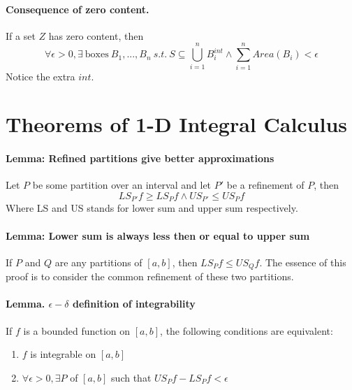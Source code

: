 \documentclass[11pt]{article}
\begin{document}
\paragraph{Consequence of zero content.}If a set $Z$ has zero content, then
\begin{equation*}
    \forall \epsilon>0, \exists~\text{boxes}~B_1,...,B_n~s.t.~ S\subseteq \bigcup_{i=1}^{n}B^{int}_i \wedge \sum_{i=1}^{n}{Area(B_i)} < \epsilon
\end{equation*}
Notice the extra $int$.
\section{Theorems of 1-D Integral Calculus}
\paragraph{Lemma: Refined partitions give better approximations} Let $P$ be some partition over an interval and let $P'$ be a refinement of $P$, then
\begin{equation*}
    LS_{P'}f \geq LS_{P}f \wedge US_{P'} \leq US_{P}f
\end{equation*}
Where LS and US stands for lower sum and upper sum respectively.

\paragraph{Lemma: Lower sum is always less then or equal to upper sum} If $P$ and $Q$ are any partitions of $[a,b]$, then $LS_Pf \leq US_Qf$. The essence of this proof is to consider the common refinement of these two partitions.

\paragraph{Lemma. $\epsilon-\delta$ definition of integrability} If $f$ is a bounded function on $[a,b]$, the following conditions are equivalent:
\begin{enumerate}
    \item $f$ is integrable on $[a,b]$
    \item $\forall \epsilon > 0, \exists P$ of $[a,b]$ such that $US_Pf - LS_Pf < \epsilon$
\end{enumerate}
\end{document}
